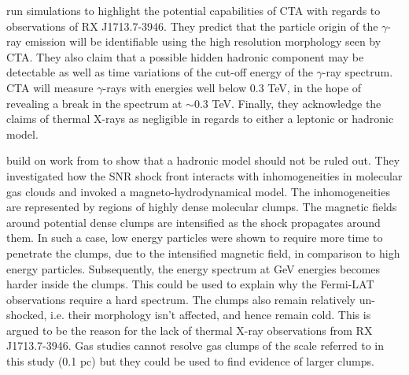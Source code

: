 \documentclass[12pt,a4paper]{article}
\begin{document}
\cite{2017ApJ...840...74A} run simulations to highlight the potential capabilities of CTA with regards to observations of RX J1713.7-3946. They predict that the particle origin of the $\gamma$-ray emission will be identifiable using the high resolution morphology seen by CTA. They also claim that a possible hidden hadronic component may be detectable as well as time variations of the cut-off energy of the $\gamma$-ray spectrum. CTA will measure $\gamma$-rays with energies well below 0.3 TeV, in the hope of revealing a break in the spectrum at $\sim$0.3 TeV. Finally, they acknowledge the claims of thermal X-rays \citep{2015ApJ...814...29K} as negligible in regards to either a leptonic or hadronic model. 

\cite{2018arXiv180410579C} build on work from \cite{2012ApJ...744...71I,2014MNRAS.445L..70G} to show that a hadronic model should not be ruled out. They investigated how the SNR shock front interacts with inhomogeneities in molecular gas clouds and invoked a magneto-hydrodynamical model. The inhomogeneities are represented by regions of highly dense molecular clumps. The magnetic fields around potential dense clumps are intensified as the shock propagates around them. In such a case, low energy particles were shown to require more time to penetrate the clumps, due to the intensified magnetic field, in comparison to high energy particles. Subsequently, the energy spectrum at GeV energies becomes harder inside the clumps. This could be used to explain why the Fermi-LAT observations require a hard spectrum. The clumps also remain relatively un-shocked, i.e. their morphology isn't affected, and hence remain cold. This is argued to be the reason for the lack of thermal X-ray observations from RX J1713.7-3946. Gas studies cannot resolve gas clumps of the scale referred to in this study (0.1 pc) but they could be used to find evidence of larger clumps.
\end{document}
